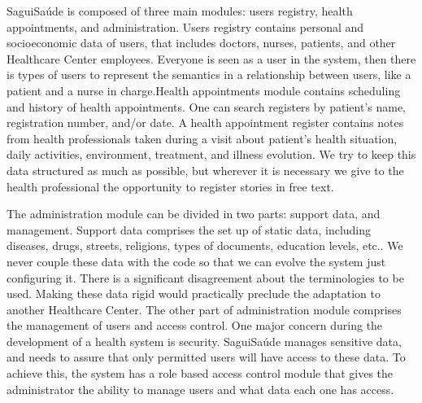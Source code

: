 \documentclass[12pt]{article}
\begin{document}
SaguiSaúde is composed of three main modules: users registry, health appointments, and administration.
Users registry contains personal and socioeconomic data of users, that includes doctors, nurses, patients, and other Healthcare Center employees. Everyone is seen as a user in the system, then there is types of users to represent the semantics in a relationship between users, like a patient and a nurse in charge.Health appointments module contains scheduling and history of health appointments. One can search registers by patient's name, registration number, and/or date. A health appointment register contains notes from health professionals taken during a visit about patient's health situation, daily activities, environment, treatment, and illness evolution. We try to keep this data structured as much as possible, but wherever it is necessary we give to the health professional the opportunity to register stories in free text.

The administration module can be divided in two parts: support data, and management. Support data comprises the set up of static data, including diseases, drugs, streets, religions, types of documents, education levels, etc.. We never couple these data with the code so that we can evolve the system just configuring it. There is a significant disagreement about the terminologies to be used. Making these data rigid would practically preclude the adaptation to another Healthcare Center. The other part of administration module comprises the management of users and access control. One major concern during the development of a health system is security. SaguiSaúde manages sensitive data, and needs to assure that only permitted users will have access to these data. To achieve this, the system has a role based access control module that gives the administrator the ability to manage users and what data each one has access.




\end{document}
